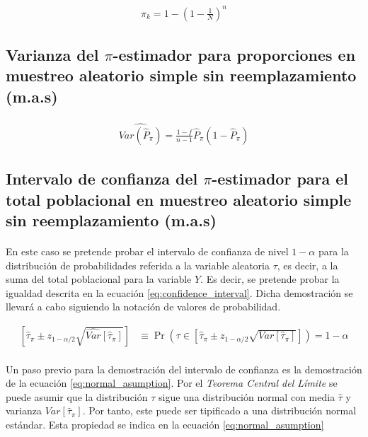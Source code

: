 \documentclass{article}
\begin{document}
      \begin{align}
        \pi_k = 1 - \left(1 - \frac{1}{N}\right)^n
      \end{align}

    \subsection{Varianza del $\pi$-estimador para proporciones en muestreo aleatorio simple sin reemplazamiento (m.a.s)}

      \paragraph{}


      \begin{align}
        \widehat{Var(\widehat{P}_\pi)} = \frac{1-f}{n-1}\widehat{P}_\pi(1-\widehat{P}_\pi)
      \end{align}

    \subsection{Intervalo de confianza del $\pi$-estimador para el total poblacional en muestreo aleatorio simple sin reemplazamiento (m.a.s)}

      \paragraph{}
      En este caso se pretende probar el intervalo de confianza de nivel $1-\alpha$ para la distribución de probabilidades referida a la variable aleatoria $\tau$, es decir, a la suma del total poblacional para la variable $Y$. Es decir, se pretende probar la igualdad descrita en la ecuación \eqref{eq:confidence_interval}. Dicha demostración se llevará a cabo siguiendo la notación de valores de probabilidad.

      \begin{align}
      \label{eq:confidence_interval}
        \left[\widehat{\tau}_\pi \pm z_{1-\alpha/2}\sqrt{\widehat{Var}[\widehat{\tau}_\pi]}\right] &\equiv \Pr\left(\tau\in \left[\widehat{\tau}_\pi \pm z_{1-\alpha/2}\sqrt{Var[\widehat{\tau}_\pi]}\right]\right) = 1-\alpha
      \end{align}

      \paragraph{}
      Un paso previo para la demostración del intervalo de confianza es la demostración de la ecuación \eqref{eq:normal_asumption}. Por el \emph{Teorema Central del Límite} se puede asumir que la distribución $\tau$ sigue una distribución normal con media $\widehat{\tau}$ y varianza $Var[\widehat{\tau}_\pi]$. Por tanto, este puede ser tipificado a una distribución normal estándar. Esta propiedad se indica en la ecuación \eqref{eq:normal_asumption}
\end{document}
